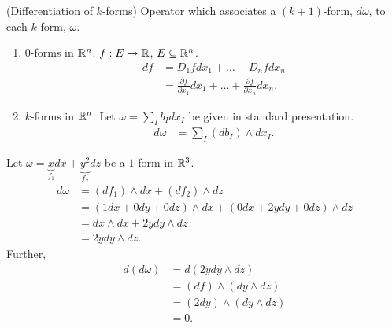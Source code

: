 \documentclass[11pt]{article}
\begin{document}
\begin{definition} (Differentiation of $k$-forms) Operator which associates a $(k + 1)$-form, $d \omega$, to each $k$-form, $\omega$.
\begin{enumerate}
  \item $0$-forms in $\mathbb{R}^n$. $f: E \to \mathbb{R}$, $E \subseteq \mathbb{R}^n$. \begin{align*} df & = D_1 fdx_1 + \dots + D_n f dx_n  \\ & = \frac{\partial f}{\partial x_1} dx_1 + \dots + \frac{\partial f}{\partial x_n} dx_n.
  \end{align*}
  \item $k$-forms in $\mathbb{R}^n$. Let $\omega = \sum_I b_I dx_I$ be given in standard presentation. \begin{align*} d \omega & = \sum_I (db_I) \wedge dx_I.
  \end{align*}
\end{enumerate}
\end{definition}

\begin{example} Let $\omega = \underbrace{x}_{f_1} dx + \underbrace{y^2}_{f_2} dz$ be a $1$-form in $\mathbb{R}^3$. \begin{align*} d \omega & = (df_1) \wedge dx + (df_2) \wedge dz \\ & = (1 dx + 0 dy + 0 dz) \wedge dx + (0dx + 2y dy + 0 dz) \wedge dz \\ & = dx \wedge dx + 2y dy \wedge dz \\ & = 2y dy \wedge dz.
\end{align*} Further, \begin{align*} d(d\omega) & = d (2y dy \wedge dz) \\ & = (df) \wedge (dy \wedge dz) \\ & = (2dy) \wedge (dy \wedge dz) \\ & = 0.
\end{align*}
\end{example}
\end{document}
